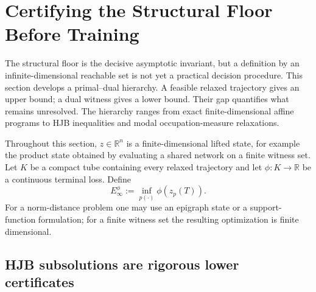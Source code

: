\documentclass[twoside,11pt]{article}
\begin{document}
\FloatBarrier

\section{Certifying the Structural Floor Before Training}
\label{sec:certification-main}
\label{sec:certification}

The structural floor is the decisive asymptotic invariant, but a definition by an infinite-dimensional reachable set is not yet a practical decision procedure.  This section develops a primal--dual hierarchy.  A feasible relaxed trajectory gives an upper bound; a dual witness gives a lower bound.  Their gap quantifies what remains unresolved.  The hierarchy ranges from exact finite-dimensional affine programs to HJB inequalities and modal occupation-measure relaxations.

Throughout this section, $z\in\mathbb R^n$ is a finite-dimensional lifted state, for example the product state obtained by evaluating a shared network on a finite witness set.  Let $K$ be a compact tube containing every relaxed trajectory and let $\phi:K\to\mathbb R$ be a continuous terminal loss.  Define
\begin{equation}
 E_\infty^\phi
 :=\inf_{p(\cdot)}\phi(z_p(T)).
 \label{eq:general-floor-objective-main}
\end{equation}
For a norm-distance problem one may use an epigraph state or a support-function formulation; for a finite witness set the resulting optimization is finite dimensional.

\subsection{HJB subsolutions are rigorous lower certificates}
\label{sec:hjb-main}

\end{document}
